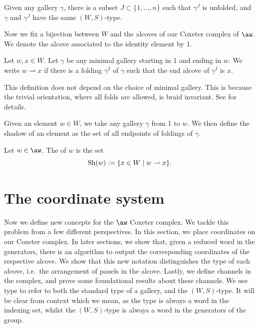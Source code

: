 \documentclass[11pt]{article}
\begin{document}
\begin{corollary}
    Given any gallery $\gamma$, there is a subset $J\subset \{1,\hdots ,n\}$ such that $\gamma^J$ is unfolded, and $\gamma$ and $\gamma^J$ have the same $(W,S)$-type.
\end{corollary}


Now we fix a bijection between $W$ and the alcoves of our Coxeter complex of $\aw$. We denote the alcove associated to the identity element by 1.

\begin{definition}
    Let $w,x\in W$. Let $\gamma$ be any minimal gallery starting in 1 and ending in $w$. We write $w\rightharpoonup x$ if there is a folding $\gamma^I$ of $\gamma$ such that the end alcove of $\gamma^I$ is $x$.
\end{definition}

\begin{remark}
    This definition does not depend on the choice of minimal gallery. This is because the trivial orientation, where all folds are allowed, is braid invariant. See \cite[Chapter 5]{SHA} for details. 
\end{remark}

Given an element $w\in W$, we take any gallery $\gamma$ from 1 to $w$. We then define the shadow of an element as the set of all endpoints of foldings of $\gamma$. 
\begin{definition}
    Let $w\in \aw$. The  of $w$ is the set 
    \[\textnormal{Sh}(w):=\{x\in W\mid w\rightharpoonup x\}.\]
\end{definition}


\section{The coordinate system}\label{exploring}

Now we define new concepts for the $\aw$ Coxeter complex. We tackle this problem from a few different perspectives. In this section, we place coordinates on our Coxeter complex. In later sections, we show that, given a reduced word in the generators, there is an algorithm to output the corresponding coordinates of the respective alcove. We show that this new notation distinguishes the type of each alcove, i.e.\ the arrangement of panels in the alcove. Lastly, we define channels in the complex, and prove some foundational results about these channels. We use type to refer to both the standard type of a gallery, and the $(W,S)$-type. It will be clear from context which we mean, as the type is always a word in the indexing set, whilst the $(W,S)$-type is always a word in the generators of the group. 
\end{document}
